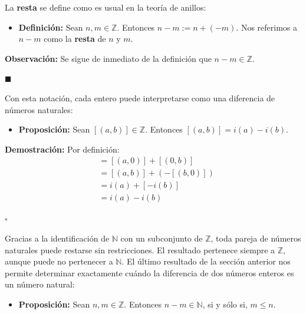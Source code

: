 \documentclass[10 pt]{article}
\begin{document}
\Large{La \textbf{resta} se define como es usual en la teoría de anillos:} \\

\begin{itemize}
    \item \Large{\textbf{Definición:} Sean $n,m \in \mathbb Z$. Entonces $n-m:=n+(-m)$. Nos referimos a $n-m$ como la \textbf{resta} de $n$ y $m$.} \\
\end{itemize}

\Large{\textbf{Observación:} Se sigue de inmediato de la definición que $n-m \in \mathbb Z$.} \\

\begin{flushright}
    $\blacksquare$
\end{flushright}

\Large{Con esta notación, cada entero puede interpretarse como una diferencia de números naturales:} \\

\begin{itemize}
    \item \Large{\textbf{Proposición:} Sean $[(a,b)] \in \mathbb Z$. Entonces $[(a,b)]=i(a)-i(b)$.} \\
\end{itemize}

\Large{\textbf{Demostración:} Por definición:}
\begin{align*}
    [(a,b)]&=[(a,0)]+[(0,b)] \\
    &=[(a,b)]+(-[(b,0)]) \\
    &=i(a)+[-i(b)] \\
    &=i(a)-i(b)
\end{align*}

\begin{flushright}
    $\square$
\end{flushright}

\Large{Gracias a la identificación de $\mathbb N$ con un subconjunto de $\mathbb Z$, toda pareja de números naturales puede restarse sin restricciones. El resultado pertenece siempre a $\mathbb Z$, aunque puede no pertenecer a $\mathbb N$. El último resultado de la sección anterior nos permite determinar exactamente cuándo la diferencia de dos números enteros es un número natural:} \\

\begin{itemize}
    \item \Large{\textbf{Proposición:} Sean $n,m \in \mathbb Z$. Entonces $n-m \in \mathbb N$, si y sólo si, $m \leq n$.} \\
\end{itemize}
\end{document}

